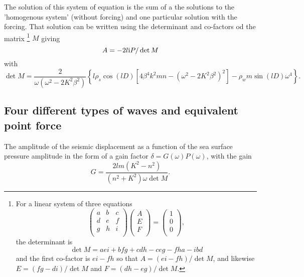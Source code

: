 The solution of this system of equation is the sum of a the solutions to the 'homogenous 
system' (without forcing) and one particular solution with the forcing. That solution can be written 
using the determinant and co-factors od the matrix \footnote{For a linear system of three equations 
\begin{equation}
\begin{pmatrix} a &b &c \\  
d &e & f \\
g &h & i \\
\end{pmatrix}\begin{pmatrix}
A\\
E\\
F\\
\end{pmatrix} =\begin{pmatrix}
1\\
0\\
0\\
\end{pmatrix}, 
\end{equation} 
the determinant is 
\begin{equation}\det M = aei + bfg + cdh - ceg -fha -ibd \end{equation}
 and the first co-factor is  $ei-fh$ 
so that  $A=(ei - fh)/\det M$, and likewise $E=(fg - di)/\det M$ and $F=(dh - eg)/\det M$. }
 $M$
giving  
\begin{equation}
A= -2 l \mathrm{i} P / \det M
\end{equation}
with 
\begin{equation}
\det M = \frac{2}{ \omega\left (\omega^2- 2  K^2 \beta^2 \right)}\left\{ l \rho_s \cos(lD) \left[4 \beta^4 k^2 m n - 
            \left (\omega^2- 2  K^2 \beta^2 \right)^2  \right]
   - \rho_w m \sin(lD) \omega^4 \right\}.
\end{equation}

\subsection{Four different types of waves and equivalent point force}
The amplitude of the seismic displacement 
as a function of the sea surface pressure amplitude 
in the form of a gain factor  $\delta= G(\omega) P(\omega)$, with the gain
\begin{equation}
G = \frac{2 l  m  (K^2-n^2 )}{(n^2+K^2)\omega \det M}.
\end{equation}

